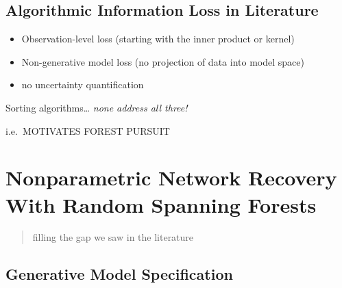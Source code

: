 \documentclass[%
	12pt,
		oneside,
		letterpaper
]{book}
\providecommand{\tightlist}{%
  \setlength{\itemsep}{0pt}\setlength{\parskip}{0pt}}\usepackage{longtable,booktabs,array}
\begin{document}
\section{Algorithmic Information Loss in
Literature}\label{algorithmic-information-loss-in-literature}

\begin{itemize}
\tightlist
\item
  Observation-level loss (starting with the inner product or kernel)
\item
  Non-generative model loss (no projection of data into model space)
\item
  no uncertainty quantification
\end{itemize}

Sorting algorithms\ldots{} \emph{none address all three!}

i.e.~MOTIVATES FOREST PURSUIT


\chapter{Nonparametric Network Recovery With Random Spanning
Forests}\label{nonparametric-network-recovery-with-random-spanning-forests}

\begin{quote}
filling the gap we saw in the literature
\end{quote}

\section{Generative Model
Specification}\label{generative-model-specification}
\end{document}
